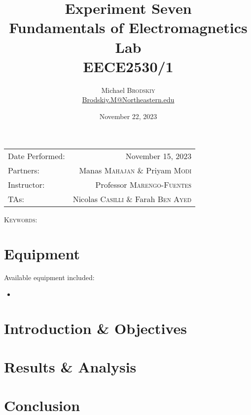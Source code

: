 \documentclass[
	letterpaper, %
	10pt, %
]{CSUniSchoolLabReport}
\title{Experiment Seven\\ Fundamentals of Electromagnetics Lab \\ EECE2530/1} %
\author{Michael \textsc{Brodskiy}\\ \small \href{mailto:Brodskiy.M@Northeastern.edu}{Brodskiy.M@Northeastern.edu}}
\date{November 22, 2023} %
\begin{document}
\maketitle %

\begin{center}
	\begin{tabular}{l r}
		Date Performed: & November 15, 2023 \\ %
        Partners: & Manas \textsc{Mahajan} \& Priyam \textsc{Modi} \\ %
		Instructor: & Professor \textsc{Marengo-Fuentes} \\ %
        TAs: & Nicolas \textsc{Casilli} \& Farah \textsc{Ben Ayed} \\ %
	\end{tabular}
\end{center}

\newpage

\begin{abstract}


\end{abstract}

\begin{flushleft}

  \textsc{Keywords:} 

\end{flushleft}

\newpage

\section{Equipment}

\hspace{.5 in} Available equipment included:\\

\begin{itemize}

  \item

\end{itemize}

\section{Introduction \& Objectives}

\section{Results \& Analysis} 

\section{Conclusion}
\end{document}
